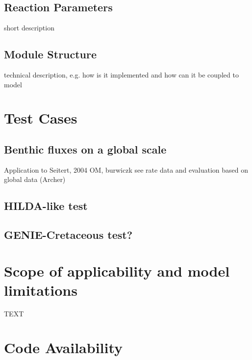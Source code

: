 \documentclass[gmd, manuscript]{copernicus}
\begin{document}
\subsection {Reaction Parameters}
short description

\subsection{Module Structure}
technical description, e.g. how is it implemented and how can it be coupled to model

\section {Test Cases}
\subsection{Benthic fluxes on a global scale}
Application to Seitert, 2004 OM, burwiczk see rate data and evaluation based on global data (Archer)

\subsection{HILDA-like test}

\subsection{GENIE-Cretaceous test?}

\section{Scope of applicability and model limitations}



\conclusions  %
TEXT

\section {Code Availability}


\appendix
\section{}    %

\subsection{}                               %
\end{document}
